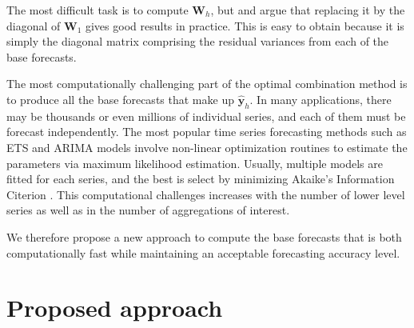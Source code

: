 \documentclass[11pt,a4paper,]{article}
\begin{document}
The most difficult task is to compute \(\bm{W}_h\), but \textcite{mint2018} and \textcite{hyndman2016fast} argue that replacing it by the diagonal of \(\bm{W}_1\) gives good results in practice. This is easy to obtain because it is simply the diagonal matrix comprising the residual variances from each of the base forecasts.

The most computationally challenging part of the optimal combination method is to produce all the base forecasts that make up \(\hat{\bm{y}}_h\). In many applications, there may be thousands or even millions of individual series, and each of them must be forecast independently. The most popular time series forecasting methods such as ETS and ARIMA models \autocite{fpp2} involve non-linear optimization routines to estimate the parameters via maximum likelihood estimation. Usually, multiple models are fitted for each series, and the best is select by minimizing Akaike's Information Citerion \autocite{akaike1998information}. This computational challenges increases with the number of lower level series as well as in the number of aggregations of interest.

We therefore propose a new approach to compute the base forecasts that is both computationally fast while maintaining an acceptable forecasting accuracy level.

\hypertarget{proposed-approach}{%
\section{Proposed approach}\label{proposed-approach}}
\end{document}
